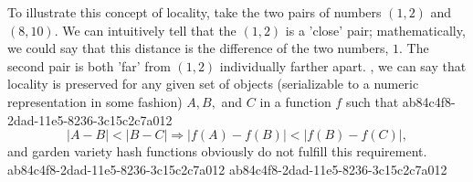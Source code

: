 \documentclass[12pt]{article}
\begin{document}
\par To illustrate this concept of locality, take the two pairs of numbers $(1,2)$ and $(8,10)$. We can intuitively tell that the $(1,2)$ is a 'close' pair; mathematically, we could say that this distance is the difference of the two numbers, $1$. The second pair is both 'far' from $(1,2)$ individually farther apart. , we can say that locality is preserved for any given set of objects (serializable to a numeric representation in some fashion) $A,B,$ and $C$ in a function $f$ such that
ab84c4f8-2dad-11e5-8236-3c15c2c7a012\begin{equation}
|A-B| < |B-C| \Rightarrow |f(A)-f(B)| < |f(B) - f(C)|,
\end{equation}
and garden variety hash functions obviously do not fulfill this requirement.
ab84c4f8-2dad-11e5-8236-3c15c2c7a012
\printbibliography
ab84c4f8-2dad-11e5-8236-3c15c2c7a012
\end{document}
